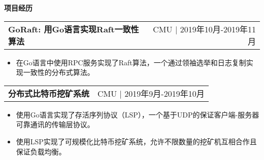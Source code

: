 \documentclass[letterpaper,11pt]{article}
\makeatletter
\newcommand{\resitem}[1]{\item  #1}
\newcommand{\resheading}[1]{{\large \colorbox{mygrey}{\begin{minipage}{\linewidth}{\textbf{#1 \vphantom{p\^{E}}}}\end{minipage}}}}
\newcommand{\ressubsubheading}[2]{
\begin{tabular*}{1.04\linewidth}{l@{\extracolsep{\fill}}r}
	\textbf{#1} & #2 \\
\end{tabular*}\vspace{-6pt}}
\makeatother
\begin{document}
\resheading{项目经历}
	\begin{description}
		\item
			\ressubsubheading{GoRaft: 用Go语言实现Raft一致性算法}{CMU $|$ 2019年10月-2019年11月}
				{ \footnotesize
				\begin{itemize}
					\resitem{在Go语言中使用RPC服务实现了Raft算法，一个通过领袖选举和日志复制实现一致性的分布式算法。}
				\end{itemize}
				}
		\item
			\ressubsubheading{分布式比特币挖矿系统}{CMU $|$ 2019年9月-2019年10月}
			{ \footnotesize
			\begin{itemize}
				\resitem{使用Go语言实现了存活序列协议（LSP），一个基于UDP的保证客户端-服务器可靠通讯的传输层协议。}
				\resitem{使用LSP实现了可规模化比特币挖矿系统，允许不限数量的挖矿机互相合作且保证负载均衡。}

			\end{itemize}
			}

	\end{description}  %
\end{document}
